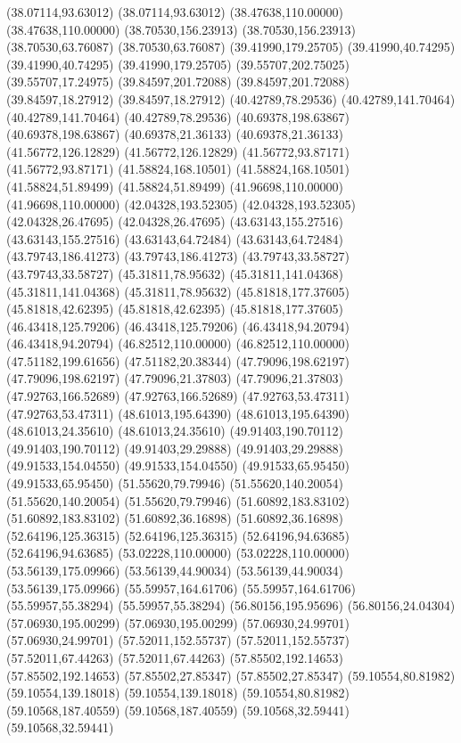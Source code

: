 {(38.07114,93.63012) (38.07114,93.63012) (38.47638,110.00000) (38.47638,110.00000) (38.70530,156.23913) (38.70530,156.23913) (38.70530,63.76087) (38.70530,63.76087)
(39.41990,179.25705) (39.41990,40.74295) (39.41990,40.74295) (39.41990,179.25705) (39.55707,202.75025) (39.55707,17.24975) (39.84597,201.72088) (39.84597,201.72088)
(39.84597,18.27912) (39.84597,18.27912) (40.42789,78.29536) (40.42789,141.70464) (40.42789,141.70464) (40.42789,78.29536) (40.69378,198.63867) (40.69378,198.63867)
(40.69378,21.36133) (40.69378,21.36133) (41.56772,126.12829) (41.56772,126.12829) (41.56772,93.87171) (41.56772,93.87171) (41.58824,168.10501) (41.58824,168.10501)
(41.58824,51.89499) (41.58824,51.89499) (41.96698,110.00000) (41.96698,110.00000) (42.04328,193.52305) (42.04328,193.52305) (42.04328,26.47695) (42.04328,26.47695)
(43.63143,155.27516) (43.63143,155.27516) (43.63143,64.72484) (43.63143,64.72484) (43.79743,186.41273) (43.79743,186.41273) (43.79743,33.58727) (43.79743,33.58727)
(45.31811,78.95632) (45.31811,141.04368) (45.31811,141.04368) (45.31811,78.95632) (45.81818,177.37605) (45.81818,42.62395) (45.81818,42.62395) (45.81818,177.37605)
(46.43418,125.79206) (46.43418,125.79206) (46.43418,94.20794) (46.43418,94.20794) (46.82512,110.00000) (46.82512,110.00000) (47.51182,199.61656) (47.51182,20.38344)
(47.79096,198.62197) (47.79096,198.62197) (47.79096,21.37803) (47.79096,21.37803) (47.92763,166.52689) (47.92763,166.52689) (47.92763,53.47311) (47.92763,53.47311)
(48.61013,195.64390) (48.61013,195.64390) (48.61013,24.35610) (48.61013,24.35610) (49.91403,190.70112) (49.91403,190.70112) (49.91403,29.29888) (49.91403,29.29888)
(49.91533,154.04550) (49.91533,154.04550) (49.91533,65.95450) (49.91533,65.95450) (51.55620,79.79946) (51.55620,140.20054) (51.55620,140.20054) (51.55620,79.79946)
(51.60892,183.83102) (51.60892,183.83102) (51.60892,36.16898) (51.60892,36.16898) (52.64196,125.36315) (52.64196,125.36315) (52.64196,94.63685) (52.64196,94.63685)
(53.02228,110.00000) (53.02228,110.00000) (53.56139,175.09966) (53.56139,44.90034) (53.56139,44.90034) (53.56139,175.09966) (55.59957,164.61706) (55.59957,164.61706)
(55.59957,55.38294) (55.59957,55.38294) (56.80156,195.95696) (56.80156,24.04304) (57.06930,195.00299) (57.06930,195.00299) (57.06930,24.99701) (57.06930,24.99701)
(57.52011,152.55737) (57.52011,152.55737) (57.52011,67.44263) (57.52011,67.44263) (57.85502,192.14653) (57.85502,192.14653) (57.85502,27.85347) (57.85502,27.85347)
(59.10554,80.81982) (59.10554,139.18018) (59.10554,139.18018) (59.10554,80.81982) (59.10568,187.40559) (59.10568,187.40559) (59.10568,32.59441) (59.10568,32.59441)
}
